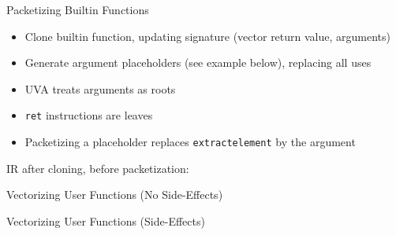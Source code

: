 \begin{frame}[fragile]{Packetizing Builtin Functions}

\begin{itemize}
    \item Clone builtin function, updating signature (vector return value, arguments)
    \item Generate argument placeholders (see example below), replacing all uses
    \item UVA treats arguments as roots
    \item \texttt{ret} instructions are leaves
    \item Packetizing a placeholder replaces \texttt{extractelement} by the argument
\end{itemize}

IR after cloning, before packetization:


\end{frame}


\begin{frame}{Vectorizing User Functions (No Side-Effects)}


\end{frame}


\begin{frame}{Vectorizing User Functions (Side-Effects)}


\end{frame}

